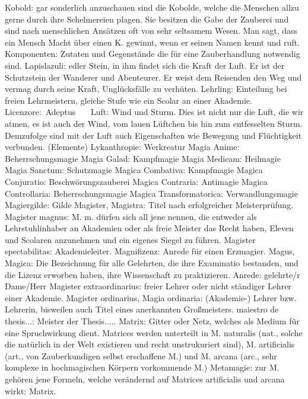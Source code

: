 \documentclass[a5paper,8pt]{book}
\begin{document}
Kobold: gar sonderlich anzuschauen sind die Kobolde, welche die Menschen allzu gerne durch ihre Schelmereien plagen. Sie besitzen die Gabe der Zauberei und sind nach menschlichen Ansätzen oft von sehr seltsamem Wesen. Man sagt, dass ein Mensch Macht über einen K. gewinnt, wenn er seinen Namen kennt und ruft.
Komponenten: Zutaten und Gegenstände die für eine Zauberhandlung notwendig sind.
Lapislazuli: edler Stein, in ihm findet sich die Kraft der Luft. Er ist der Schutzstein der Wanderer und Abenteurer. Er weist dem Reisenden den Weg und vermag durch seine Kraft, Unglücksfälle zu verhüten.
Lehrling: Einteilung bei freien Lehrmeistern, gleiche Stufe wie ein \textit{}Scolar an einer Akademie.
Licenzore: \textit{}Adeptus   
Luft: Wind und Sturm. Dies ist nicht nur die Luft, die wir atmen, es ist auch der Wind, vom lauen Lüftchen bis hin zum entfesselten Sturm. Demzufolge sind mit der Luft auch Eigenschaften wie Bewegung und Flüchtigkeit verbunden. (\textit{}Elemente)
Lykanthropie: \textit{}Werkreatur
Magia Anime: \textit{} Beherrschungsmagie
Magia Galad: \textit{}Kampfmagie
Magia Medicam: \textit{}Heilmagie
Magia Sanctum: \textit{}Schutzmagie
Magica Combativa: \textit{}Kampfmagie
Magica Conjuratio: \textit{}Beschwörungszauberei
Magica Contraria: \textit{}Antimagie
Magica Controllaria: \textit{}Beherrschungsmagie
Magica Transformatorica: \textit{}Verwandlungsmagie
Magiergilde: \textit{}Gilde
Magister, Magistra: Titel nach erfolgreicher Meisterprüfung.
Magister magnus: M. m. dürfen sich all jene nennen, die entweder als Lehrstuhlinhaber an Akademien oder als freie Meister das Recht haben, Eleven und \textit{}Scolaren anzunehmen und ein eigenes Siegel zu führen.
Magister spectabilitas: Akademieleiter.
Magnifizenz: Anrede für einen \textit{}Erzmagier.
Magus, Magica: Die Bezeichnung für alle Gelehrten, die ihre \textit{}Examinatio bestanden, und die Lizenz erworben haben, ihre Wissenschaft zu praktizieren. Anrede: gelehrte/r Dame/­Herr
Magister extraordinarius: freier Lehrer oder nicht ständiger Lehrer einer Akademie.
Magister ordinarius, Magia ordinaria: (Akademie-) Lehrer bzw. Lehrerin, bisweilen auch Titel eines an­erkan­nten Großmeisters.
maiestro de thesis...: Meister der Thesis.....
Matrix: Gitter oder Netz, welches als Medium für eine Spruch­wirkung dient. Matrices werden unterteilt in M. naturalis (nat., solche die natürlich in der Welt existieren und recht unstrukuriert sind), M. artificialis (art., von Zauberkundigen selbst erschaffene M.) und M. arcana (arc., sehr komplexe in hochmagischen Körpern vor­kommende M.)
Metamagie: zur M. gehören jene Formeln, welche ver­ändernd auf Matrices artificialis und arcana wirkt: \textit{}Matrix.
\end{document}
